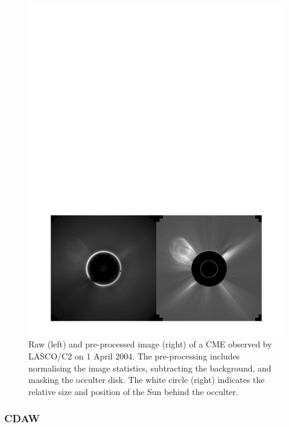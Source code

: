\documentclass[namedreferences]{SolarPhysics}
\begin{document}
\begin{article}
\begin{figure}[!t]
\centerline{\includegraphics[scale=0.8, clip=true, trim=0 30 0 500]{images/normalising.pdf}}
\caption{Raw (left) and pre-processed image (right) of a CME observed by LASCO/C2 on 1 April 2004. The pre-processing includes normalising the image statistics, subtracting the background, and masking the occulter disk. The white circle (right) indicates the relative size and position of the Sun behind the occulter.}
\label{init_rm}
\end{figure}

\subsubsection{CDAW}


\end{article}
\end{document}
